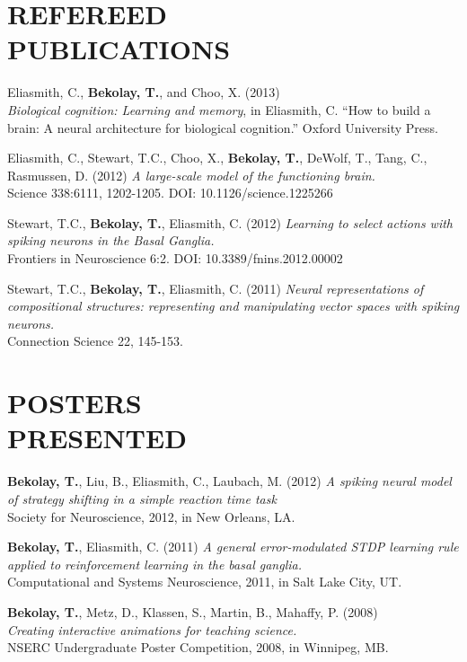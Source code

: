 \documentclass[line,margin]{res}
\begin{document}
\begin{resume}
\clearpage

\section{REFEREED \\PUBLICATIONS}
  Eliasmith, C., \textbf{Bekolay, T.}, and Choo, X. (2013) \\
   {\sl Biological cognition: Learning and memory}, in Eliasmith, C. ``How to build a brain: A neural architecture for biological cognition.'' Oxford University Press.

  Eliasmith, C., Stewart, T.C., Choo, X., \textbf{Bekolay, T.},
    DeWolf, T., Tang, C., Rasmussen, D. (2012)
    {\sl A large-scale model of the functioning brain.} \\
    Science 338:6111, 1202-1205. DOI: 10.1126/science.1225266

  Stewart, T.C., \textbf{Bekolay, T.}, Eliasmith, C. (2012)
    {\sl Learning to select actions with spiking neurons in the Basal Ganglia.} \\
    Frontiers in Neuroscience 6:2. DOI: 10.3389/fnins.2012.00002

  Stewart, T.C., \textbf{Bekolay, T.}, Eliasmith, C. (2011)
    {\sl Neural representations of compositional structures: representing and manipulating vector spaces with spiking neurons.} \\
    Connection Science 22, 145-153.

\section{POSTERS \\PRESENTED}
  \textbf{Bekolay, T.}, Liu, B., Eliasmith, C., Laubach, M. (2012)
    {\sl A spiking neural model of strategy shifting in a simple reaction time task} \\
    Society for Neuroscience, 2012, in New Orleans, LA.

  \textbf{Bekolay, T.}, Eliasmith, C. (2011)
    {\sl A general error-modulated STDP learning rule applied to reinforcement learning in the basal ganglia.} \\
    Computational and Systems Neuroscience, 2011, in Salt Lake City, UT.
  
  \textbf{Bekolay, T.}, Metz, D., Klassen, S., Martin, B., Mahaffy, P. (2008) \\
    {\sl Creating interactive animations for teaching science.} \\
    NSERC Undergraduate Poster Competition, 2008, in Winnipeg, MB.


\end{resume}
\end{document}
